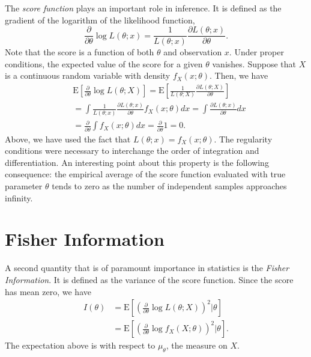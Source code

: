 The \emph{score function} plays an important role in inference.
It is defined as the gradient of the logarithm of the likelihood function,
\begin{equation*}
\frac{\partial}{\partial \theta} \log L(\theta ; x)
= \frac{1}{L (\theta; x)} \frac{\partial L (\theta; x)}{\partial \theta} .
\end{equation*}
Note that the score is a function of both $\theta$ and observation $x$.
Under proper conditions, the expected value of the score for a given $\theta$ vanishes.
Suppose that $X$ is a continuous random variable with density $f_{X} (x; \theta)$.
Then, we have
\begin{equation*}
\begin{split}
&\mathrm{E} \left[ \frac{\partial}{\partial \theta} \log L(\theta ; X) \right]
= \mathrm{E} \left[ \frac{1}{L (\theta; X)} \frac{\partial L (\theta; X)}{\partial \theta} \right] \\
&= \int \frac{1}{L (\theta; x)} \frac{\partial L (\theta; x)}{\partial \theta} f_{X} (x; \theta) dx
= \int \frac{\partial L (\theta; x)}{\partial \theta} dx \\
&= \frac{\partial}{\partial \theta} \int f_X (x; \theta) dx
= \frac{\partial}{\partial \theta} 1 = 0 .
\end{split}
\end{equation*}
Above, we have used the fact that $L (\theta; x) = f_X (x; \theta)$.
The regularity conditions were necessary to interchange the order of integration and differentiation.
An interesting point about this property is the following consequence: the empirical average of the score function evaluated with true parameter $\theta$ tends to zero as the number of independent samples approaches infinity.


\section{Fisher Information}

A second quantity that is of paramount importance in statistics is the \emph{Fisher Information}.
It is defined as the variance of the score function.
Since the score has mean zero, we have
\begin{equation*}
\begin{split}
I (\theta)
&= \mathrm{E} \left[ \left( \frac{\partial}{\partial \theta} \log L (\theta; X) \right)^2 \Big| \theta \right] \\
&= \mathrm{E} \left[ \left( \frac{\partial}{\partial \theta} \log f_X (X; \theta) \right)^2 \Big| \theta \right] .
\end{split}
\end{equation*}
The expectation above is with respect to $\mu_{\theta}$, the measure on $X$.

